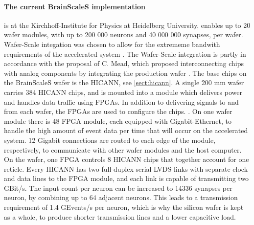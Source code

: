 \paragraph{The current BrainScaleS implementation} is at the Kirchhoff-Institute for Physics at Heidelberg University, enables up to 20 wafer modules, with up to 200 000 neurons and 40 000 000 synapses, per wafer.
Wafer-Scale integation was chosen to allow for the extrememe bandwith requirements of the accelerated system \cite{zoschke_full_2017}.
The Wafer-Scale integration is partly in accordance with the proposal of C. Mead, which proposed interconnecting chips with analog components by integrating the production wafer \cite{mead_neuromorphic_1990}.
The base chips on the BrainScaleS wafer is the HICANN, see \vref{sect:hicann}.
A single 200 mm wafer carries 384 HICANN chips, and is mounted into a module which delivers power and handles data traffic using FPGAs.
In addition to delivering signals to and from each wafer, the FPGAs are used to configure the chips. \cite{zoschke_full_2017}.
On one wafer module there is 48 FPGA module, each equipped with Gigabit-Ethernet, to handle the high amount of event data per time that will occur on the accelerated system.
12 Gigabit connections are routed to each edge of the module, respectively, to communicate with other wafer modules and the host computer.
On the wafer, one FPGA controls 8 HICANN chips that together account for one reticle.
Every HICANN has two full-duplex serial LVDS links with separate clock and data lines to the FPGA module, and each link is capable of transmitting two GBit/s.
The input count per neuron can be increased to 14336 synapses per neuron, by combining up to 64 adjacent neurons.
This leads to a transmission requirement of 1.4 GEvents/s per neuron, which is why the silicon wafer is kept as a whole, to produce shorter transmission lines and a lower capacitive load.
\cite{zoschke_full_2017}


